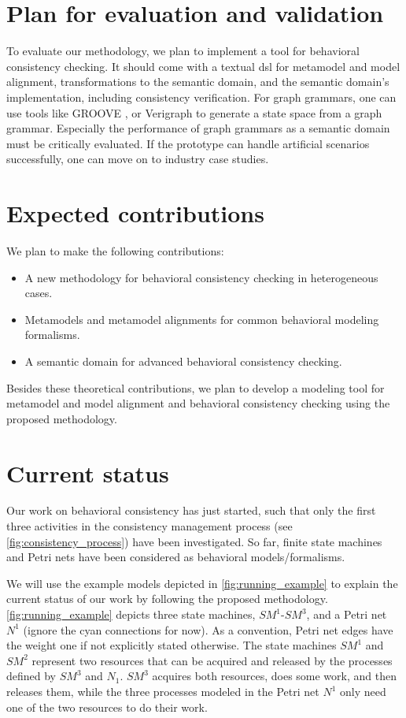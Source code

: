 \documentclass[conference]{IEEEtran}
\begin{document}
\section{Plan for evaluation and validation}
To evaluate our methodology, we plan to implement a tool for behavioral consistency checking.
It should come with a textual \gls{dsl} for metamodel and model alignment, transformations to the semantic domain, and the semantic domain's implementation, including consistency verification.
For graph grammars, one can use tools like GROOVE \cite{ghamarianModellingAnalysisUsing2012, rensinkGROOVESimulatorTool2004}, or Verigraph \cite{costaVerigraphSystemSpecification2016} to generate a state space from a graph grammar.
Especially the performance of graph grammars as a semantic domain must be critically evaluated.
If the prototype can handle artificial scenarios successfully, one can move on to industry case studies.

\section{Expected contributions}
We plan to make the following contributions:
\begin{itemize}
    \item A new methodology for behavioral consistency checking in heterogeneous cases.
    \item Metamodels and metamodel alignments for common behavioral modeling formalisms.
    \item A semantic domain for advanced behavioral consistency checking.
\end{itemize}
Besides these theoretical contributions, we plan to develop a modeling tool for metamodel and model alignment and behavioral consistency checking using the proposed methodology.
\section{Current status} \label{sec:currentStatus}
Our work on behavioral consistency has just started, such that only the first three activities in the consistency management process (see \autoref{fig:consistency_process}) have been investigated.
So far, finite state machines and Petri nets have been considered as behavioral models/formalisms.

We will use the example models depicted in \autoref{fig:running_example} to explain the current status of our work by following the proposed methodology.
\autoref{fig:running_example} depicts three state machines, $SM^1$-$SM^3$, and a Petri net $N^1$ (ignore the cyan connections for now).
As a convention, Petri net edges have the weight one if not explicitly stated otherwise.
The state machines $SM^1$ and $SM^2$ represent two resources that can be acquired and released by the processes defined by $SM^3$ and $N_1$.
$SM^3$ acquires both resources, does some work, and then releases them, while the three processes modeled in the Petri net $N^1$ only need one of the two resources to do their work.
\end{document}
